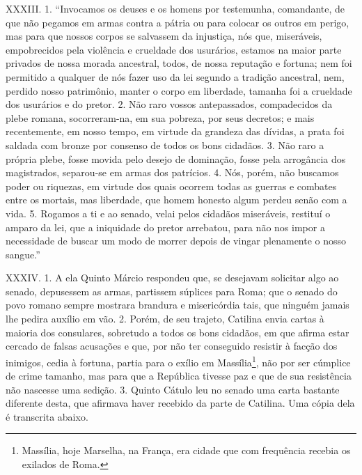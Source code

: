 XXXIII. 1. “Invocamos os deuses e os homens por testemunha, comandante, de que
não pegamos em armas contra a pátria ou para colocar os outros em perigo, mas
para que nossos corpos se salvassem da injustiça, nós que, miseráveis, empobrecidos 
pela violência e crueldade dos usurários, estamos na maior parte privados de
nossa morada ancestral, todos, de nossa reputação e fortuna; nem foi permitido
a qualquer de nós fazer uso da lei segundo a tradição ancestral, nem, perdido
nosso patrimônio, manter o corpo em liberdade, tamanha foi a crueldade dos
usurários e do pretor. 2. Não raro vossos antepassados, compadecidos da plebe
romana, socorreram-na, em sua pobreza, por seus decretos; e mais recentemente,
em nosso tempo, em virtude da grandeza das dívidas, a prata foi saldada com
bronze por consenso de todos os bons cidadãos. 3. Não raro a própria plebe,
fosse movida pelo desejo de dominação, fosse pela arrogância dos magistrados,
separou-se em armas dos patrícios. 4. Nós, porém, não buscamos poder ou
riquezas, em virtude dos quais ocorrem todas as guerras e combates entre os
mortais, mas liberdade, que homem honesto algum perdeu senão com a vida. 5.
Rogamos a ti e ao senado, velai pelos cidadãos miseráveis, restituí o amparo da
lei, que a iniquidade do pretor arrebatou, para não nos impor a necessidade de
buscar um modo de morrer depois de vingar plenamente o nosso sangue.”

XXXIV. 1. A ela Quinto Márcio respondeu que, se desejavam solicitar algo ao
senado, depusessem as armas, partissem súplices para Roma; que o senado do povo
romano sempre mostrara brandura e misericórdia tais, que ninguém jamais lhe
pedira auxílio em vão. 2. Porém, de seu trajeto, Catilina envia cartas à maioria
dos consulares, sobretudo a todos os bons cidadãos, em que afirma estar
cercado de falsas acusações e que, por não ter conseguido resistir à facção dos
inimigos, cedia à fortuna, partia para o exílio em Massília\footnote{Massília,
hoje Marselha, na França, era cidade que com frequência recebia os exilados de
Roma.}, não por ser cúmplice de crime tamanho, mas para que a República tivesse
paz e que de sua resistência não nascesse uma sedição. 3. Quinto Cátulo leu no
senado uma carta bastante diferente desta, que afirmava haver recebido da parte
de Catilina. Uma cópia dela é transcrita abaixo.

